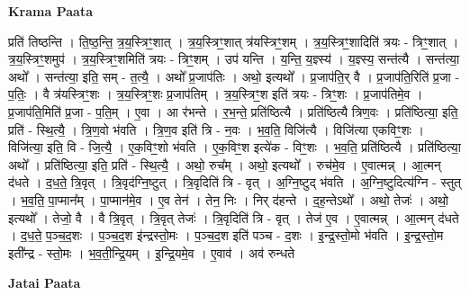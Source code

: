 \documentclass[17pt]{extarticle}
\begin{document}
\textbf{Krama Paata} \newline

प्रति॑ तिष्ठन्ति । ति॒ष्ठ॒न्ति॒ त्र॒य॒स्त्रिꣳ॒॒शात् । त्र॒य॒स्त्रिꣳ॒॒शात् त्र॑यस्त्रिꣳ॒॒शम् । त्र॒य॒स्त्रिꣳ॒॒शादिति॑ त्रयः - त्रिꣳ॒॒शात् । त्र॒य॒स्त्रिꣳ॒॒शमुप॑ । त्र॒य॒स्त्रिꣳ॒॒शमिति॑ त्रयः - त्रिꣳ॒॒शम् । उप॑ यन्ति । य॒न्ति॒ य॒ज्ञ्स्य॑ । य॒ज्ञ्स्य॒ सन्त॑त्यै । सन्त॑त्या॒ अथो᳚ । सन्त॑त्या॒ इति॒ सम् - त॒त्यै॒ । अथो᳚ प्र॒जाप॑तिः । अथो॒ इत्यथो᳚ । प्र॒जाप॑ति॒र् वै । प्र॒जाप॑ति॒रिति॑ प्र॒जा - प॒तिः॒ । वै त्र॑यस्त्रिꣳ॒॒शः । त्र॒य॒स्त्रिꣳ॒॒शः प्र॒जाप॑तिम् । त्र॒य॒स्त्रिꣳ॒॒श इति॑ त्रयः - त्रिꣳ॒॒शः । प्र॒जाप॑तिमे॒व । प्र॒जाप॑ति॒मिति॑ प्र॒जा - प॒ति॒म् । ए॒वा । आ र॑भन्ते । र॒भ॒न्ते॒ प्रति॑ष्ठित्यै । प्रति॑ष्ठित्यै त्रिण॒वः । प्रति॑ष्ठित्या॒ इति॒ प्रति॑ - स्थि॒त्यै॒ । त्रि॒ण॒वो भ॑वति । त्रि॒ण॒व इति॑ त्रि - न॒वः । भ॒व॒ति॒ विजि॑त्यै । विजि॑त्या एकविꣳ॒॒शः । विजि॑त्या॒ इति॒ वि - जि॒त्यै॒ । ए॒क॒विꣳ॒॒शो भ॑वति । ए॒क॒विꣳ॒॒श इत्ये॑क - विꣳ॒॒शः । भ॒व॒ति॒ प्रति॑ष्ठित्यै । प्रति॑ष्ठित्या॒ अथो᳚ । प्रति॑ष्ठित्या॒ इति॒ प्रति॑ - स्थि॒त्यै॒ । अथो॒ रुच᳚म् । अथो॒ इत्यथो᳚ । रुच॑मे॒व । ए॒वात्मन्न् । आ॒त्मन् द॑धते । द॒ध॒ते॒ त्रि॒वृत् । त्रि॒वृद॑ग्नि॒ष्टुत् । त्रि॒वृदिति॑ त्रि - वृत् । अ॒ग्नि॒ष्टुद् भ॑वति । अ॒ग्नि॒ष्टुदित्य॑ग्नि - स्तुत् । भ॒व॒ति॒ पा॒प्मान᳚म् । पा॒प्मान॑मे॒व । ए॒व तेन॑ । तेन॒ निः । निर् द॑हन्ते । द॒ह॒न्तेऽथो᳚ । अथो॒ तेजः॑ । अथो॒ इत्यथो᳚ । तेजो॒ वै । वै त्रि॒वृत् । त्रि॒वृत् तेजः॑ । त्रि॒वृदिति॑ त्रि - वृत् । तेज॑ ए॒व । ए॒वात्मन्न् । आ॒त्मन् द॑धते । द॒ध॒ते॒ प॒ञ्च॒द॒शः । प॒ञ्च॒द॒श इ॑न्द्रस्तो॒मः । प॒ञ्च॒द॒श इति॑ पञ्च - द॒शः । इ॒न्द्र॒स्तो॒मो भ॑वति । इ॒न्द्र॒स्तो॒म इती᳚न्द्र - स्तो॒मः । भ॒व॒ती॒न्द्रि॒यम् । इ॒न्द्रि॒यमे॒व । ए॒वाव॑ । अव॑ रुन्धते \newline

\textbf{Jatai Paata} \newline
\end{document}
